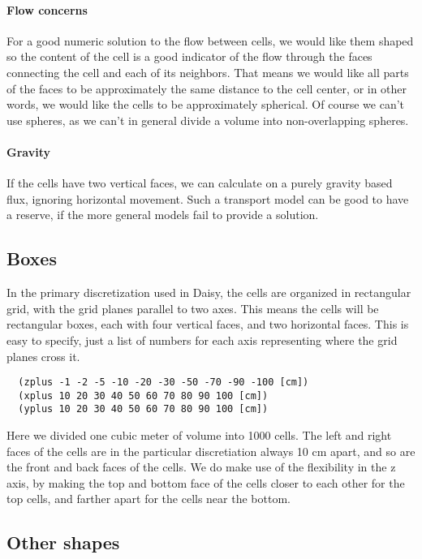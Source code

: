 \documentclass[a4paper,11pt,twoside]{article}
\begin{document}
\paragraph{Flow concerns}
For a good numeric solution to the flow between cells, we would like
them shaped so the content of the cell is a good indicator of the flow
through the faces connecting the cell and each of its neighbors.  That
means we would like all parts of the faces to be approximately the
same distance to the cell center, or in other words, we would like the
cells to be approximately spherical.  Of course we can't use spheres,
as we can't in general divide a volume into non-overlapping spheres.

\paragraph{Gravity}
If the cells have two vertical faces, we can calculate on a purely
gravity based flux, ignoring horizontal movement.  Such a transport
model can be good to have a reserve, if the more general models fail
to provide a solution.

\subsection{Boxes}

In the primary discretization used in Daisy, the cells are organized
in rectangular grid, with the grid planes parallel to two axes.  This
means the cells will be rectangular boxes, each with four vertical
faces, and two horizontal faces.  This is easy to specify, just a list
of numbers for each axis representing where the grid planes cross it.
\begin{verbatim}
  (zplus -1 -2 -5 -10 -20 -30 -50 -70 -90 -100 [cm])
  (xplus 10 20 30 40 50 60 70 80 90 100 [cm])
  (yplus 10 20 30 40 50 60 70 80 90 100 [cm])
\end{verbatim}
Here we divided one cubic meter of volume into 1000 cells.  The left
and right faces of the cells are in the particular discretiation
always 10 cm apart, and so are the front and back faces of the cells.
We do make use of the flexibility in the z axis, by making the top and
bottom face of the cells closer to each other for the top cells, and
farther apart for the cells near the bottom.

\subsection{Other shapes}
\end{document}
